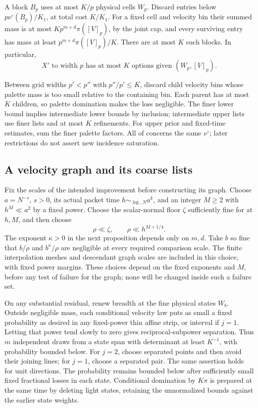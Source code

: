 A block \(B_p\) uses at most \(K/p\) physical cells \(W_p\).
Discard entries below \(p\nu^\circ(B_p)/K_1\), at total cost
\(K/K_1\). For a fixed cell and velocity bin their summed mass is
at most \(Kp^{m+d}\pi([V]_p)\), by the joint cap, and every
surviving entry has mass at least \(p^{m+d}\pi([V]_p)/K\).
There are at most \(K\) such blocks. In particular,
\begin{equation}\label{a05:derivative-list}
 X'\text{ to width }p\text{ has at most }K\text{ options given }
                    (W_p,[V]_p).
\end{equation}

Between grid widths \(p'<p''\) with \(p''/p'\leq K\), discard
child velocity bins whose palette mass is too small relative to
the containing bin. Each parent has at most \(K\) children, so
palette domination makes the loss negligible. The finer lower
bound implies intermediate lower bounds by inclusion; intermediate
upper lists use finer lists and at most \(K\) refinements.
For upper prior and fixed-time estimates, sum the finer palette
factors. All of  concerns the same
\(\nu^\circ\); later restrictions do not assert new incidence
saturation.


\subsection{A velocity graph and its coarse lists}

Fix the scales of the intended improvement before constructing its
graph. Choose \(a=N^{-s}\), \(s>0\), its actual packet time
\(h\sim_{\log,N}a^k\), and an integer \(M\geq2\) with
\(h^M\ll a^2\) by a fixed power. Choose the scalar-normal floor
\(\zeta\) sufficiently fine for  at \(h,M\),
and then choose
\[
 \rho\ll\zeta,\qquad \rho\ll h^{M+1/4}.
\]
The exponent \(\kappa>0\) in the next proposition depends only on
\(m,d\). Take \(b\) so fine that \(b/\rho\) and
\(b^\kappa/\rho\) are negligible at every required comparison scale.
The finite interpolation meshes and descendant graph scales are
included in this choice, with fixed power margins. These choices
depend on the fixed exponents and \(M\), before any test of failure
for the graph; none will be changed inside such a failure set.

On any substantial residual, renew breadth at the fine physical states
\(W_b\). Outside negligible mass, each conditional velocity law puts
as small a fixed probability as desired in any fixed-power thin affine
strip, or interval if \(j=1\). Letting that power tend slowly to zero
gives reciprocal-subpower separation. Thus \(m\) independent draws
from a state span with determinant at least \(K^{-1}\), with
probability bounded below. For \(j=2\), choose separated points and
then avoid their joining lines; for \(j=1\), choose a separated pair.
The same assertion holds for unit directions. The probability remains
bounded below after sufficiently small fixed fractional losses in
each state. Conditional domination by \(K\pi\) is prepared at the same
time by deleting light states, retaining the unnormalized bounds
against the earlier state weights.

